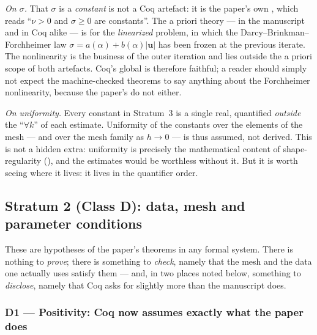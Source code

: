 \documentclass[11pt]{article}
\newcommand{\coq}[1]{\texttt{\detokenize{#1}}}
\newcommand{\lbl}[1]{\texttt{\detokenize{#1}}}
\begin{document}
\emph{On $\sigma$.} That $\sigma$ is a \emph{constant} is not a Coq artefact:
it is the paper's own \lbl{H:data}, which reads ``$\nu>0$ and $\sigma\ge0$ are
constants''. The a priori theory --- in the manuscript and in Coq alike --- is
for the \emph{linearized} problem, in which the Darcy--Brinkman--Forchheimer law
$\sigma=a(\alpha)+b(\alpha)|\mathbf u|$ has been frozen at the previous
iterate. The nonlinearity is the business of the outer iteration and lies
outside the a priori scope of both artefacts. Coq's global \coq{sigma : R} is
therefore faithful; a reader should simply not expect the machine-checked
theorems to say anything about the Forchheimer nonlinearity, because the paper's
do not either.

\emph{On uniformity.} Every constant in Stratum~3 is a single real, quantified
\emph{outside} the ``$\forall k$'' of each estimate. Uniformity of the constants
over the elements of the mesh --- and over the mesh family as $h\to0$ --- is
thus assumed, not derived. This is not a hidden extra: uniformity is precisely
the mathematical content of shape-regularity (\lbl{H:mesh}), and the estimates
would be worthless without it. But it is worth seeing where it lives: it lives
in the quantifier order.

\subsection{Stratum 2 (Class D): data, mesh and parameter conditions}\label{sec:stratumD}

These are hypotheses of the paper's theorems in any formal system. There is
nothing to \emph{prove}; there is something to \emph{check}, namely that the
mesh and the data one actually uses satisfy them --- and, in two places noted
below, something to \emph{disclose}, namely that Coq asks for slightly more than
the manuscript does.

\subsubsection{D1 --- Positivity: Coq now assumes exactly what the paper does}
\end{document}
